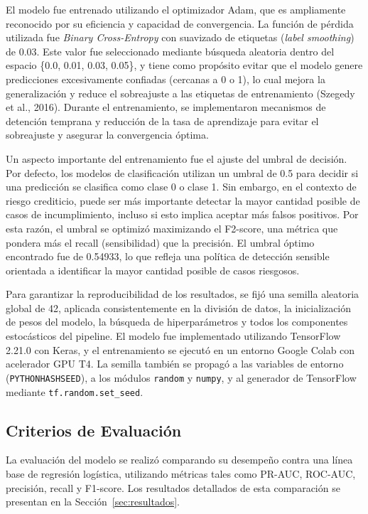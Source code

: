 \documentclass[12pt,a4paper]{article}
\begin{document}
El modelo fue entrenado utilizando el optimizador Adam, que es ampliamente reconocido por su eficiencia y capacidad de convergencia. La función de pérdida utilizada fue \textit{Binary Cross-Entropy} con suavizado de etiquetas (\textit{label smoothing}) de 0.03. Este valor fue seleccionado mediante búsqueda aleatoria dentro del espacio \{0.0, 0.01, 0.03, 0.05\}, y tiene como propósito evitar que el modelo genere predicciones excesivamente confiadas (cercanas a 0 o 1), lo cual mejora la generalización y reduce el sobreajuste a las etiquetas de entrenamiento (Szegedy et al., 2016). Durante el entrenamiento, se implementaron mecanismos de detención temprana y reducción de la tasa de aprendizaje para evitar el sobreajuste y asegurar la convergencia óptima.

Un aspecto importante del entrenamiento fue el ajuste del umbral de decisión. Por defecto, los modelos de clasificación utilizan un umbral de 0.5 para decidir si una predicción se clasifica como clase 0 o clase 1. Sin embargo, en el contexto de riesgo crediticio, puede ser más importante detectar la mayor cantidad posible de casos de incumplimiento, incluso si esto implica aceptar más falsos positivos. Por esta razón, el umbral se optimizó maximizando el F2-score, una métrica que pondera más el recall (sensibilidad) que la precisión. El umbral óptimo encontrado fue de 0.54933, lo que refleja una política de detección sensible orientada a identificar la mayor cantidad posible de casos riesgosos.

Para garantizar la reproducibilidad de los resultados, se fijó una semilla aleatoria global de 42, aplicada consistentemente en la división de datos, la inicialización de pesos del modelo, la búsqueda de hiperparámetros y todos los componentes estocásticos del pipeline. El modelo fue implementado utilizando TensorFlow 2.21.0 con Keras, y el entrenamiento se ejecutó en un entorno Google Colab con acelerador GPU T4. La semilla también se propagó a las variables de entorno (\texttt{PYTHONHASHSEED}), a los módulos \texttt{random} y \texttt{numpy}, y al generador de TensorFlow mediante \texttt{tf.random.set\_seed}.

\subsection{Criterios de Evaluación}

La evaluación del modelo se realizó comparando su desempeño contra una línea base de regresión logística, utilizando métricas tales como PR-AUC, ROC-AUC, precisión, recall y F1-score. Los resultados detallados de esta comparación se presentan en la Sección~\ref{sec:resultados}.
\end{document}
